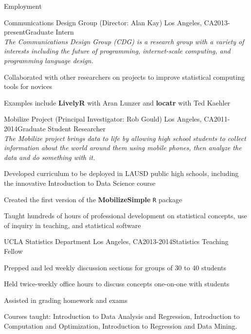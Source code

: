 \documentclass{resume} %
\begin{document}
\begin{rSection}{Employment}

\begin{rSubsection}{Communications Design Group } {(Director: Alan Kay) \hfill Los Angeles, CA}{2013-present}{Graduate Intern \\ {\em The Communications Design Group (CDG) is a research group with a variety of interests including the future of programming, internet-scale computing, and programming language design.}}
\item Collaborated with other researchers on projects to improve statistical computing tools for novices
\item Examples include \textbf{LivelyR} with Aran Lunzer and \textbf{locatr} with Ted Kaehler
\end{rSubsection}


\begin{rSubsection}{Mobilize Project }{(Principal Investigator: Rob Gould) \hfill Los Angeles, CA}{2011-2014}{Graduate Student Researcher \\ {\em The Mobilize project brings data to life by allowing high school students to collect information about the world around them using mobile phones, then analyze the data and do something with it.}}
\item Developed curriculum to be deployed in LAUSD public high schools, including the innovative Introduction to Data Science course
\item Created the first version of the \textbf{MobilizeSimple} \verb#R# package
\item Taught hundreds of hours of professional development on statistical concepts, use of inquiry in teaching, and statistical software
\end{rSubsection}


\begin{rSubsection}{UCLA Statistics Department }{\hfill Los Angeles, CA}{2013-2014}{Statistics Teaching Fellow}
\item Prepped and led weekly discussion sections for groups of 30 to 40 students
\item Held twice-weekly office hours to discuss concepts one-on-one with students
\item Assisted in grading homework and exams
\item Courses taught: Introduction to Data Analysis and Regression, Introduction to Computation and Optimization, Introduction to Regression and Data Mining.
\end{rSubsection}

\end{rSection}
\end{document}
